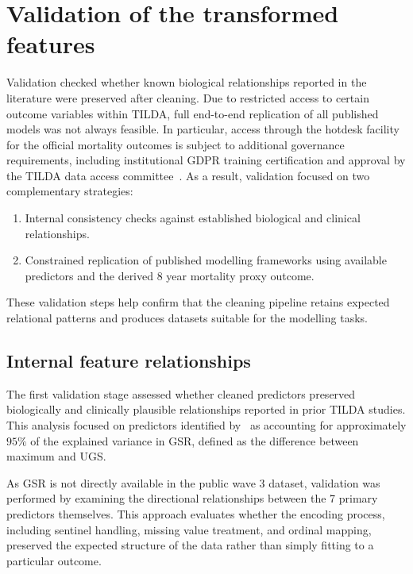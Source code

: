\section{Validation of the transformed features}
Validation checked whether known biological relationships reported in the literature were preserved after cleaning.
Due to restricted access to certain outcome variables within \gls{TILDA}, full end-to-end replication of all published models was not always feasible. In particular, access through the hotdesk facility for the official mortality outcomes is subject to additional governance requirements, including institutional \gls{GDPR} training certification and approval by the \gls{TILDA} data access committee~\cite{HotDesksIrish}. As a result, validation focused on two complementary strategies: 
\begin{enumerate}[label= (\roman*)]
\item Internal consistency checks against established biological and clinical relationships. 
\item Constrained replication of published modelling frameworks using available predictors and the derived 8 year mortality proxy outcome. 
\end{enumerate}
These validation steps help confirm that the cleaning pipeline retains expected relational patterns and produces datasets suitable for the modelling tasks.

\subsection{Internal feature relationships}
The first validation stage assessed whether cleaned predictors preserved biologically and clinically plausible relationships reported in prior \gls{TILDA} studies. This analysis focused on predictors identified by~\cite{davisLinearRegressionbasedMachine2021} as accounting for approximately $95\%$ of the explained variance in \gls{GSR}, defined as the difference between maximum and \gls{UGS}.

As \gls{GSR} is not directly available in the public wave 3 dataset, validation was performed by examining the directional relationships between the 7 primary predictors themselves. This approach evaluates whether the encoding process, including sentinel handling, missing value treatment, and ordinal mapping, preserved the expected structure of the data rather than simply fitting to a particular outcome.

